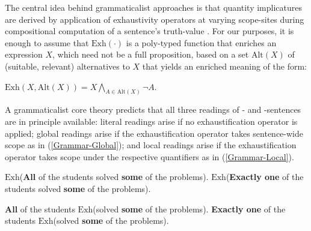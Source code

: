 \documentclass[fleqn,reqno,10pt]{article}
\newcommand{\as}{\acro{as}}
\renewcommand{\es}{\acro{es}}
\newcommand{\exh}{\ensuremath{\mathrm{Exh}}}
\newcommand{\alt}{\ensuremath{\mathrm{Alt}}}
\renewcommand{\mymark}[1]{\textbf{#1}}
\begin{document}
The central idea behind grammaticalist approaches is that quantity
implicatures are derived by application of exhaustivity operators at
varying scope-sites during compositional computation of a sentence's
truth-value
\citep[see][]{Chierchia2006:Broaden-Your-Vi,Magri2011:Another-Argumen,Sauerland2012:The-Computation,ChierchiaFox2008:The-Grammatical}. For
our purposes, it is enough to assume that $\exh(\cdot)$ is a
poly-typed function that enriches an expression $X$, which need not be
a full proposition, based on a set $\alt(X)$ of (suitable, relevant)
alternatives to $X$ that yields an enriched meaning of the
form:%
\begin{exe}
  \ex \label{bsp:Exh-Def} $\exh(X,\alt(X)) = X \bigwedge_{A \in
      \alt(X)} \neg A$.
\end{exe}
%
A grammaticalist core theory predicts that all three readings of \as-
and \es-sentences are in principle available: literal readings arise
if no exhaustification operator is applied; global readings arise if
the exhaustification operator takes sentence-wide scope as in
(\ref{Grammar-Global}); and local readings arise if the
exhaustification operator takes scope under the respective quantifiers
as in (\ref{Grammar-Local}).

\begin{exe}
  \ex \label{Grammar-Global}
    \begin{xlist}
      \ex \label{Grammar-Global-AE} \mymark{$\exh$}(\mymark{All} of the students solved
        \mymark{some} of the problems).
      \ex \label{Grammar-Global-GE} \mymark{$\exh$}(\mymark{Exactly one} of the students solved
        \mymark{some} of the problems).
    \end{xlist}
\end{exe}

\begin{exe}
  \ex \label{Grammar-Local}
    \begin{xlist}
      \ex \label{Grammar-Local-AE} \mymark{All} of the students \mymark{$\exh$}(solved
        \mymark{some} of the problems).
      \ex \label{Grammar-Local-GE} \mymark{Exactly one} of the
        students \mymark{$\exh$}(solved
        \mymark{some} of the problems).
    \end{xlist}
\end{exe}
\end{document}
